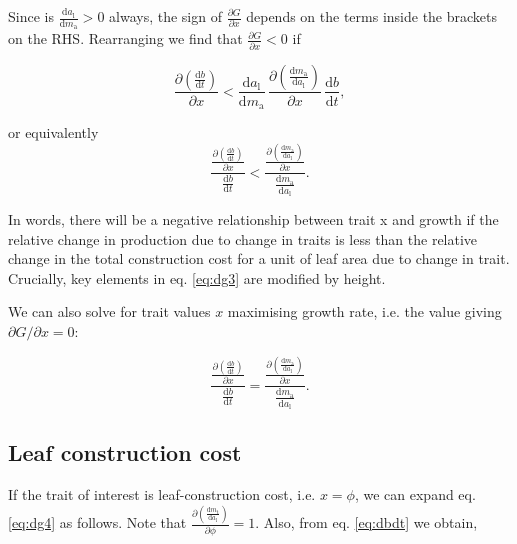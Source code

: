 \documentclass[12pt, a4paper]{article}
\begin{document}
\begin{appendices}
Since is $\frac{\textrm{d}a_\textrm{l}} {\textrm{d}m_\textrm{a}}>0$ always, the sign
of $\frac{\partial G} {\partial x}$ depends on the terms inside the brackets on the
RHS. Rearranging we find that $\frac
{\partial G} {\partial x} < 0$ if

\begin{equation}\label{eq:dg3}
\frac{\partial \left( \frac{ \textrm{d}b} {\textrm{d}t}\right)}{\partial x}
< \frac{\textrm{d}a_\textrm{l}} {\textrm{d}m_\textrm{a}}
\,  \frac{\partial \left(\frac{\textrm{d}m_\textrm{a}} {\textrm{d}a_\textrm{l}}\right)
}{\partial x} \, \frac{ \textrm{d}b} {\textrm{d}t},
\end{equation}

or equivalently
\begin{equation}\label{eq:dg4}
\frac{
\frac{\partial \left( \frac{ \textrm{d}b} {\textrm{d}t}\right)}{\partial x} }
{\frac{ \textrm{d}b} {\textrm{d}t}}
<
\frac{ \frac{\partial \left(\frac{\textrm{d}m_\textrm{a}} {\textrm{d}a_\textrm{l}}\right)
}{\partial x}}{\frac{\textrm{d}m_\textrm{a}} {\textrm{d}a_\textrm{l}}}.
\end{equation}

In words, there will be a negative relationship between trait x and growth if the
relative change in production due to change in traits is less than the relative change
in the total construction cost for a unit of leaf area due to change in trait. Crucially,
key elements in eq. \ref{eq:dg3} are modified by height.

We can also solve for trait values $x$ maximising growth rate, i.e. the value
giving $\partial G /\partial x = 0$:

\begin{equation}\label{eq:max}
\frac{
\frac{\partial \left( \frac{ \textrm{d}b} {\textrm{d}t}\right)}{\partial x} }
{\frac{ \textrm{d}b} {\textrm{d}t}}
=
\frac{ \frac{\partial \left(\frac{\textrm{d}m_\textrm{a}} {\textrm{d}a_\textrm{l}}\right)
}{\partial x}}{\frac{\textrm{d}m_\textrm{a}} {\textrm{d}a_\textrm{l}}}.
\end{equation}

\subsection{Leaf construction cost}

If the trait of interest is leaf-construction cost, i.e. $x=\phi$, we can expand
eq. \ref{eq:dg4} as follows. Note that $\frac{\partial \left(\frac{\textrm{d}m_\textrm
{t}} {\textrm{d}a_\textrm{l}}\right)}{\partial \phi} = 1$. Also, from eq. \ref{eq:dbdt} we obtain,


\end{appendices}
\end{document}
